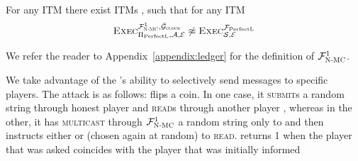   \begin{theorem}
    \label{theorem:perfectledger}
    For any ITM \perfectprot{} there exist ITMs \perfectenv,
    \perfectadv{} such that for any ITM \simulator
    \begin{equation*}
      \textsc{Exec}^{\mathcal{F}_{\textsc{N-MC}}^1, \bar{\mathcal{G}}_{\textsc{clock}}}_{\Pi_{\mathrm{PerfectL}}, \mathcal{A},
      \mathcal{E}} \not\approx \textsc{Exec}^{\mathcal{F}_{\mathrm{PerfectL}}}_{\mathcal{S},
      \mathcal{E}}
    \end{equation*}
  \end{theorem}

  We refer the reader to Appendix~\ref{appendix:ledger} for the definition of
  $\mathcal{F}_{\textsc{N-MC}}^1$.

  \begin{proofsketch}
    We take advantage of the \adversary's ability to selectively send messages
    to specific players. The attack is as follows: \environment{} flips a coin.
    In one case, it \textsc{submit}s a random string through honest player
    \alice{} and \textsc{read}s through another player \bob,
    whereas in the other, it has \adversary{} \textsc{multicast} through
    $\mathcal{F}_{\textsc{N-MC}}^1$ a random string only to \alice and then instructs either
    \alice{} or \bob{} (chosen again at random) to \textsc{read}. \environment{}
    returns 1 when the player that was asked coincides with the player that was
    initially informed 
  \end{proofsketch}

